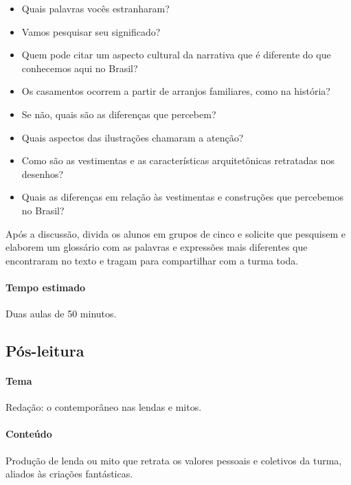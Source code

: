 \documentclass[11pt]{extarticle}
\begin{document}
\begin{itemize}
\item Quais palavras vocês estranharam?
\item Vamos pesquisar seu significado?
\item Quem pode citar um aspecto cultural da narrativa que é diferente do que conhecemos aqui no Brasil?
\item Os casamentos ocorrem a partir de arranjos familiares, como na história?
\item Se não, quais são as diferenças que percebem?
\item Quais aspectos das ilustrações chamaram a atenção?
\item Como são as vestimentas e as características arquitetônicas retratadas nos desenhos?
\item Quais as diferenças em relação às vestimentas e construções que percebemos no Brasil?
\end{itemize}

Após a discussão, divida os alunos em grupos de cinco e solicite que pesquisem e elaborem um glossário com as palavras e expressões mais diferentes que encontraram no texto e tragam para compartilhar com a turma toda. 

\paragraph{Tempo estimado} Duas aulas de 50 minutos.




\subsection{Pós-leitura}


\paragraph{Tema} Redação: o contemporâneo nas lendas e mitos.

\paragraph{Conteúdo} Produção de lenda ou mito que retrata os valores pessoais e coletivos da turma, aliados às criações fantásticas.
\end{document}
